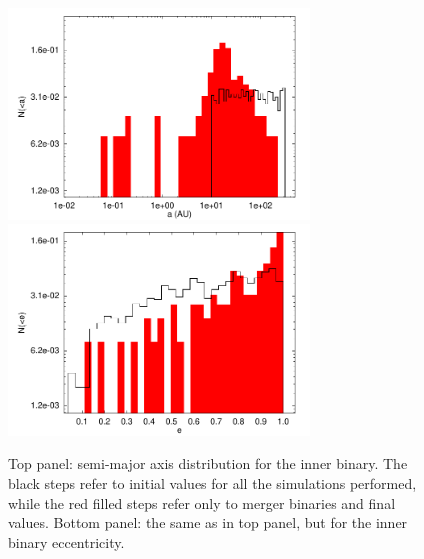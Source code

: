 \documentclass[twocolumn]{aastex62}
\begin{document}
\begin{figure}
\centering
\includegraphics[width=8cm]{merger_semi_histo}\\
\includegraphics[width=8cm]{merger_ecce_histo}
\caption{Top panel: semi-major axis distribution for the inner binary. The black steps refer to initial values for all the simulations performed, while the red filled steps refer only to merger binaries and final values. Bottom panel: the same as in top panel, but for the inner binary eccentricity.}
\label{F6}
\end{figure}
\end{document}

